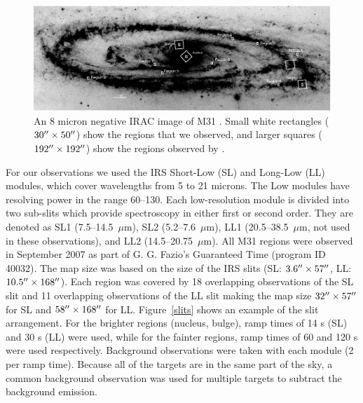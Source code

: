 \documentclass[useAMS,usenatbib,a4paper]{mn2e}
\begin{document}
\begin{figure}
\centering
\includegraphics[scale=0.9]{./fig2.eps}
\caption{An 8 micron negative IRAC image of M31 \citep{Barmby2006lr}. Small white rectangles ($30\hbox{$^{\prime\prime}$}\times50\hbox{$^{\prime\prime}$}$) show the regions that we observed, and larger squares ($192\hbox{$^{\prime\prime}$}\times192\hbox{$^{\prime\prime}$}$) show the regions observed by  \citet{1998Cesarsky}.
\label{m31}
}
\end{figure}


For our observations we used the IRS Short-Low (SL) and Long-Low (LL) modules, which cover wavelengths from 5 to 21 microns. 
The Low modules have resolving power in the range 60--130. Each low-resolution module is divided into two sub-slits 
which provide spectroscopy in either first or second order. They are denoted as SL1 (7.5--14.5~$\mu$m), SL2 (5.2--7.6~$\mu$m),
LL1 (20.5--38.5~$\mu$m, not used in these observations), and LL2 (14.5--20.75~$\mu$m).
All M31 regions were observed in September 2007 as part of G. G. Fazio's Guaranteed Time (program ID 40032). 
The map size was based on the size 
of the IRS slits (SL: $3.6\hbox{$^{\prime\prime}$} \times 57\hbox{$^{\prime\prime}$}$, LL: $10.5\hbox{$^{\prime\prime}$} \times 168\hbox{$^{\prime\prime}$}$). Each region was covered by 18 overlapping observations 
of the SL slit and 11 overlapping observations of the LL slit making the map size $32\hbox{$^{\prime\prime}$} \times 57\hbox{$^{\prime\prime}$}$ for SL and $58\hbox{$^{\prime\prime}$} \times 168\hbox{$^{\prime\prime}$}$ for LL. 
Figure~\ref{slits} shows an example of the slit arrangement. For the brighter regions (nucleus, bulge), ramp times of 14 s (SL) and 30 s (LL) were used, 
while for the fainter regions, ramp times of 60 and 120 s were used respectively. Background observations were taken with each module (2 per ramp time). 
Because all of the targets are in the same part of the sky, a common background observation was used for multiple targets to subtract the background emission. 
\end{document}
